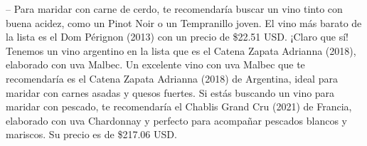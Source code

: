 \documentclass[conference]{IEEEtran}
\begin{document}
-- Para maridar con carne de cerdo, te recomendaría buscar un vino tinto con buena acidez, como un Pinot Noir o un Tempranillo joven.
El vino más barato de la lista es el Dom Pérignon (2013) con un precio de \$22.51 USD.
¡Claro que sí! Tenemos un vino argentino en la lista que es el Catena Zapata Adrianna (2018), elaborado con uva Malbec.
Un excelente vino con uva Malbec que te recomendaría es el Catena Zapata Adrianna (2018) de Argentina, ideal para maridar con carnes asadas y quesos fuertes.
Si estás buscando un vino para maridar con pescado, te recomendaría el Chablis Grand Cru (2021) de Francia, elaborado con uva Chardonnay y perfecto para acompañar pescados blancos y mariscos. Su precio es de \$217.06 USD.




\end{document}
